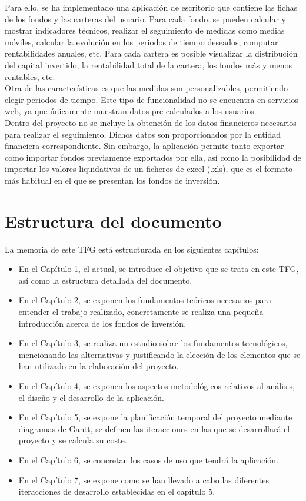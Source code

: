 \documentclass[12pt, a4paper]{book}
\begin{document}
Para ello, se ha implementado una aplicación de escritorio que contiene las fichas de los fondos y las carteras del usuario. Para cada fondo, se pueden calcular y mostrar indicadores técnicos, realizar el seguimiento de medidas como medias móviles, calcular la evolución en los periodos de tiempo deseados, computar rentabilidades anuales, etc. Para cada cartera es posible visualizar la distribución del capital invertido, la rentabilidad total de la cartera, los fondos más y menos rentables, etc.\\
 
Otra de las características es que las medidas son personalizables, permitiendo elegir periodos de tiempo. Este tipo de funcionalidad no se encuentra en servicios web, ya que únicamente muestran datos pre calculados a los usuarios.\\


Dentro del proyecto no se incluye la obtención de los datos financieros necesarios para realizar el seguimiento. Dichos datos son proporcionados por la entidad financiera correspondiente. Sin embargo, la aplicación permite tanto exportar como importar fondos previamente exportados por ella, así como la posibilidad de importar los valores liquidativos de un ficheros de excel (.xls), que es el formato más habitual en el que se presentan los fondos de inversión.\\

\newpage


\section{Estructura del documento}

La memoria de este \gls{TFG} está estructurada en los siguientes capítulos:

\begin{itemize}
	\item En el Capítulo 1, el actual, se introduce el objetivo que se trata en este TFG, así como la estructura detallada del documento.
	\item En el Capítulo 2, se exponen los fundamentos teóricos necesarios para entender el trabajo realizado, concretamente se realiza una pequeña introducción acerca de los fondos de inversión.
	\item En el Capítulo 3, se realiza un estudio sobre los fundamentos tecnológicos, mencionando las alternativas y justificando la elección de los elementos que se han utilizado en la elaboración del proyecto.
	\item En el Capítulo 4, se exponen los aspectos metodológicos relativos al análisis, el diseño y el desarrollo de la aplicación.
	\item En el Capítulo 5, se expone la planificación temporal del proyecto mediante diagramas de Gantt, se definen las iteracciones en las que se desarrollará el proyecto y se calcula su coste.
	\item En el Capítulo 6, se concretan los casos de uso que tendrá la aplicación.
	\item En el Capítulo 7, se expone como se han llevado a cabo las diferentes iteracciones de desarrollo establecidas en el capítulo 5.

\end{itemize}
\end{document}
